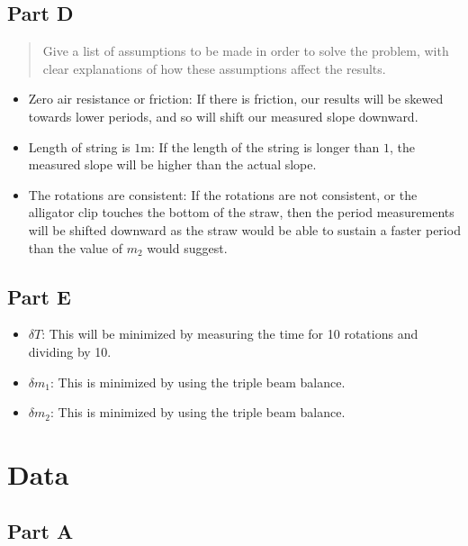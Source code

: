 \documentclass[8pt]{extarticle}
\begin{document}
{\subsection*{Part D}
\begin{quote}
	Give a list of assumptions to be made in order to solve the problem, with clear explanations of how these assumptions affect the results.
\end{quote}
\begin{itemize}
	\item Zero air resistance or friction: If there is friction, our results will be skewed towards lower periods, and so will shift our measured slope downward.
	\item Length of string is $1$m: If the length of the string is longer than $1$, the measured slope will be higher than the actual slope.
	\item The rotations are consistent: If the rotations are not consistent, or the alligator clip touches the bottom of the straw, then the period measurements will be shifted downward as the straw would be able to sustain a faster period than the value of $m_2$ would suggest.
\end{itemize}
\subsection*{Part E}%
\label{sub:Part E}
\begin{itemize}
	\item $\delta T$: This will be minimized by measuring the time for 10 rotations and dividing by 10.
	\item $\delta m_1$: This is minimized by using the triple beam balance.
	\item $\delta m_2$: This is minimized by using the triple beam balance.
\end{itemize}
\section*{Data}
\subsection*{Part A}%
\label{sub:Part A}

}
\end{document}
